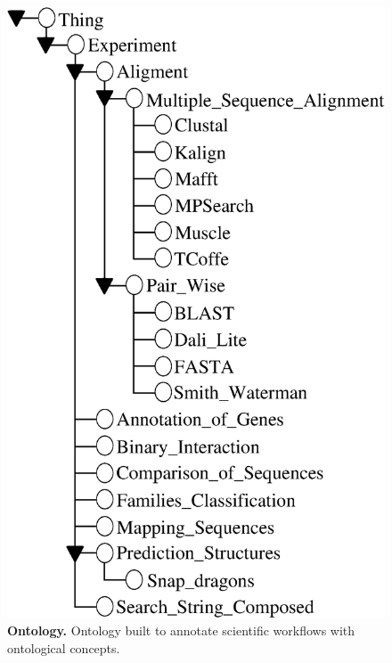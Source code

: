 \documentclass{RITA}
\begin{document}
\begin{figure}[!htb]
	\centering
	\includegraphics[scale = 0.3]{./pics/ontologia.eps}
	\caption{{\bf Ontology.} Ontology built to annotate scientific workflows with ontological concepts.}
	\label{FIGURA_ONTOLOGIA_CONSTRUIDA}
\end{figure}
\end{document}
